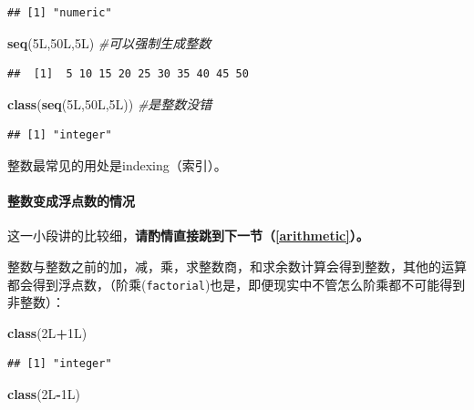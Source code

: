 \documentclass[]{book}
\newenvironment{Shaded}{\begin{snugshade}}{\end{snugshade}}
\newcommand{\CommentTok}[1]{\textcolor[rgb]{0.56,0.35,0.01}{\textit{#1}}}
\newcommand{\KeywordTok}[1]{\textcolor[rgb]{0.13,0.29,0.53}{\textbf{#1}}}
\newcommand{\NormalTok}[1]{#1}
\newcommand{\OperatorTok}[1]{\textcolor[rgb]{0.81,0.36,0.00}{\textbf{#1}}}
\let\oldparagraph\paragraph
\renewcommand{\paragraph}[1]{\oldparagraph{#1}\mbox{}}
\begin{document}
\begin{verbatim}
## [1] "numeric"
\end{verbatim}

\begin{Shaded}
\begin{Highlighting}[]
\KeywordTok{seq}\NormalTok{(5L,50L,5L) }\CommentTok{#可以强制生成整数}
\end{Highlighting}
\end{Shaded}

\begin{verbatim}
##  [1]  5 10 15 20 25 30 35 40 45 50
\end{verbatim}

\begin{Shaded}
\begin{Highlighting}[]
\KeywordTok{class}\NormalTok{(}\KeywordTok{seq}\NormalTok{(5L,50L,5L)) }\CommentTok{#是整数没错}
\end{Highlighting}
\end{Shaded}

\begin{verbatim}
## [1] "integer"
\end{verbatim}

整数最常见的用处是indexing（索引）。

\hypertarget{math-int-to-double}{%
\paragraph{整数变成浮点数的情况}\label{math-int-to-double}}

这一小段讲的比较细，\textbf{请酌情直接跳到下一节（\ref{arithmetic}）。}

整数与整数之前的加，减，乘，求整数商，和求余数计算会得到整数，其他的运算都会得到浮点数，（阶乘(\texttt{factorial})也是，即便现实中不管怎么阶乘都不可能得到非整数）：

\begin{Shaded}
\begin{Highlighting}[]
\KeywordTok{class}\NormalTok{(2L}\OperatorTok{+}\NormalTok{1L)}
\end{Highlighting}
\end{Shaded}

\begin{verbatim}
## [1] "integer"
\end{verbatim}

\begin{Shaded}
\begin{Highlighting}[]
\KeywordTok{class}\NormalTok{(2L}\OperatorTok{-}\NormalTok{1L)}
\end{Highlighting}
\end{Shaded}
\end{document}
